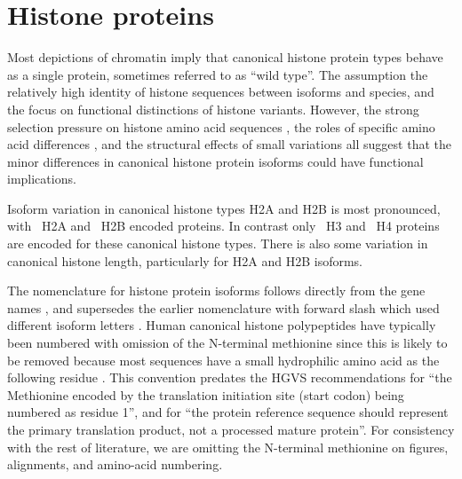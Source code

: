 \section{Histone proteins}
  Most depictions of chromatin imply that
  canonical histone protein types behave as a single protein,
  sometimes referred to as ``wild type''.
  The assumption the relatively high identity of histone sequences
  between isoforms and species,
  and the focus on functional distinctions of histone variants.
  However, the strong selection pressure on histone amino acid
  sequences \citep{birth-death-review},
  the roles of specific amino acid differences \citep{MazeAllis2014},
  and the structural effects of small variations \citep{KurumizakaCOSB2013}
  all suggest that the minor differences in canonical histone protein isoforms
  could have functional implications.

  Isoform variation in canonical histone types H2A and H2B is most pronounced,
  with \HTwoAUniqueProteins{}~H2A and \HTwoBUniqueProteins{}~H2B encoded proteins.
  In contrast only \HThreeUniqueProteins{}~H3 and \HFourUniqueProteins{}~H4 proteins
  are encoded for these canonical histone types.
  There is also some variation in canonical histone length, particularly for H2A and H2B isoforms.

  The nomenclature for histone protein isoforms follows directly
  from the gene names \citep{Marzluff02},
  and supersedes the earlier nomenclature with forward slash which used different isoform letters
  \citep{AlbigGenomics1997,AlbigHumangen1997}.
  Human canonical histone polypeptides have typically been numbered
  with omission of the N-terminal methionine
  since this is likely to be removed because most sequences have
  a small hydrophilic amino acid as the following residue \citep{XiaoPeiBiochem2010}.
  This convention predates the HGVS recommendations for ``the Methionine encoded
  by the translation initiation site (start codon) being numbered as residue 1'',
  and for ``the protein reference sequence should represent the primary
  translation product, not a processed mature protein''.  For consistency
  with the rest of literature, we are omitting the N-terminal methionine
  on figures, alignments, and amino-acid numbering.

